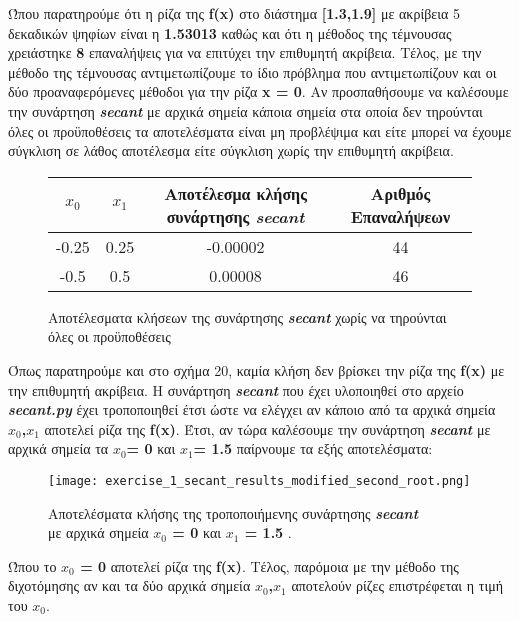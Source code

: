 \documentclass[First Project.tex]{subfiles}
\begin{document}
Ώπου παρατηρούμε ότι η ρίζα της \textlatin{\textbf{f(x)}} στο διάστημα \textlatin{\textbf{[1.3,1.9]}} με ακρίβεια 5 δεκαδικών ψηφίων 
είναι η \textbf{1.53013} καθώς και ότι η μέθοδος της τέμνουσας χρειάστηκε \textbf{8} επαναλήψεις για να επιτύχει την 
επιθυμητή ακρίβεια. Τέλος, με την μέθοδο της τέμνουσας αντιμετωπίζουμε το ίδιο πρόβλημα που αντιμετωπίζουν και οι δύο προαναφερόμενες μέθοδοι
για την ρίζα \textbf{\textlatin{x = 0}}. Αν προσπαθήσουμε να καλέσουμε την συνάρτηση \textit{\textlatin{\textbf{secant}}} με αρχικά 
σημεία κάποια σημεία στα οποία δεν τηρούνται όλες οι προϋποθέσεις τα αποτελέσματα είναι μη προβλέψιμα και είτε μπορεί να έχουμε σύγκλιση σε 
λάθος αποτέλεσμα είτε σύγκλιση χωρίς την επιθυμητή ακρίβεια.
\vspace{10mm}
\begin{figure}[h!]
    \centering
    \captionsetup{justification=centering}
    \begin{center}
        \begin{tabular}{ |c|c|c|c| }       
            \hline
            \textbf{\textlatin{$x_{0}$}} & \textlatin{$x_{1}$} & Αποτέλεσμα κλήσης συνάρτησης \textit{\textlatin{\textbf{secant}}} & Αριθμός Επαναλήψεων \\
            \hline
            -0.25 & 0.25 & -0.00002 & 44 \\
            -0.5 & 0.5 & 0.00008 & 46 \\ [1ex]
            \hline
        \end{tabular}
        \caption{ Αποτέλεσματα κλήσεων της συνάρτησης \textit{\textlatin{\textbf{secant}}} χωρίς να τηρούνται όλες οι προϋποθέσεις}
    \end{center}
\end{figure}

Όπως παρατηρούμε και στο σχήμα 20, καμία κλήση δεν βρίσκει την ρίζα της \textlatin{\textbf{f(x)}} με την επιθυμητή ακρίβεια. Η συνάρτηση 
\textit{\textlatin{\textbf{secant}}} που έχει υλοποιηθεί στο αρχείο \textit{\textlatin{\textbf{secant.py}}} έχει τροποποιηθεί έτσι
ώστε να ελέγχει αν κάποιο από τα αρχικά σημεία \textbf{\textlatin{$x_{0}$,$x_{1}$}} αποτελεί ρίζα της \textlatin{\textbf{f(x)}}. Έτσι, αν τώρα
καλέσουμε την συνάρτηση \textit{\textlatin{\textbf{secant}}} με αρχικά σημεία τα \textlatin{\textbf{$x_{0}$= 0}} και 
\textlatin{\textbf{$x_{1}$= 1.5}} παίρνουμε τα εξής αποτελέσματα:
\vspace{5px}
\begin{figure}[h!]
    \centering
    \captionsetup{justification=centering}
    \begin{center}
    \texttt{[image: exercise\_1\_secant\_results\_modified\_second\_root.png]}    
    \caption{ Αποτελέσματα κλήσης της τροποποιήμενης συνάρτησης \textit{\textlatin{\textbf{secant}}} \\ με αρχικά σημεία 
                \textbf{\textlatin{$x_{0}$ = 0}} και \textbf{\textlatin{$x_{1}$ = 1.5}} . }
    \end{center}
\end{figure}

Ώπου το \textbf{\textlatin{$x_{0}$ = 0}} αποτελεί ρίζα της \textlatin{\textbf{f(x)}}. Τέλος, παρόμοια με την μέθοδο της διχοτόμησης αν και
τα δύο αρχικά σημεία \textbf{\textlatin{$x_{0}$,$x_{1}$}} αποτελούν ρίζες επιστρέφεται η τιμή του \textbf{\textlatin{$x_{0}$}}.

\newpage
\end{document}
